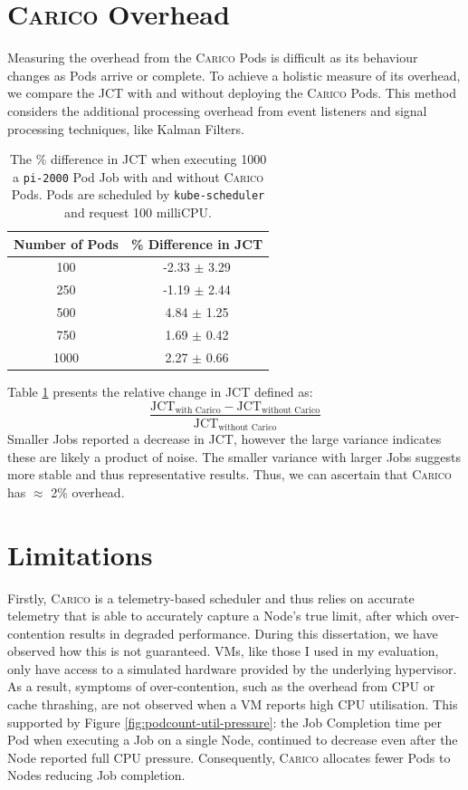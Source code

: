 \section{\textsc{Carico} Overhead}
\label{sec:eval-overhead}
Measuring the overhead from the \textsc{Carico} Pods is difficult as its
behaviour changes as Pods arrive or complete. To achieve a holistic measure of
its overhead, we compare the JCT with and without deploying
the \textsc{Carico} Pods. This method considers the additional processing
overhead from event listeners and signal processing techniques, like Kalman
Filters.

\begin{table}[ht!]
\centering
    \begin{tabular}{|c|c|}
    \hline
    \textbf{Number of Pods} & \textbf{\% Difference in JCT} \\
    \hline
        100 & -2.33 $\pm$ 3.29 \\
        250 & -1.19 $\pm$ 2.44 \\
        500 & 4.84  $\pm$ 1.25 \\
        750 & 1.69  $\pm$ 0.42 \\
        1000 & 2.27  $\pm$ 0.66 \\
    \hline
    \end{tabular}
    \label{tab:overhead}
    \caption{The \% difference in JCT when executing 1000 a \texttt{pi-2000}
    Pod Job with and without \textsc{Carico} Pods. Pods are scheduled by
    \texttt{kube-scheduler} and request 100 milliCPU.}
\end{table}

Table \ref{tab:overhead} presents the relative change in JCT defined as:
\[
\frac{\text{JCT}_{\text{with Carico}} - \text{JCT}_{\text{without
Carico}}}{\text{JCT}_{\text{without Carico}}}
\]
Smaller Jobs reported a decrease
in JCT, however the large variance indicates these are likely a product of
noise. The smaller variance with larger Jobs suggests more stable and thus
representative results. Thus, we can ascertain that \textsc{Carico} has
$\approx$ 2\% overhead.

\section{Limitations}

Firstly, \textsc{Carico} is a telemetry-based scheduler and thus relies on accurate
telemetry that is able to accurately capture a Node's true limit, after which
over-contention results in degraded performance. During this dissertation, we
have observed how this is not guaranteed. VMs, like those I used in my
evaluation, only have access to a simulated hardware provided by the underlying
hypervisor. As a result, symptoms of over-contention, such as the overhead from
CPU or cache thrashing, are not observed when a VM reports high CPU utilisation.
This supported by Figure \ref{fig:podcount-util-pressure}: the Job Completion
time per Pod when executing a Job on a single Node, continued to decrease even
after the Node reported full CPU pressure. Consequently, \textsc{Carico}
allocates fewer Pods to Nodes reducing Job completion.

